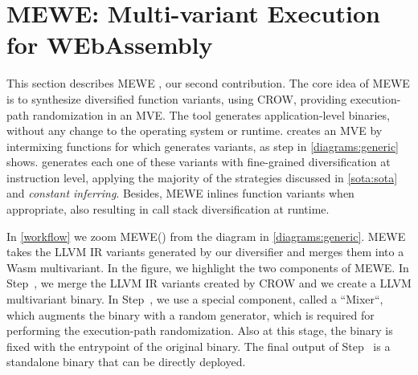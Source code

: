 \section{MEWE: Multi-variant Execution for WEbAssembly}
\label{section:mewe}

\newcommand{\tool}{MEWE\xspace}
\newcommand{\repourl}{TODO}
This section describes MEWE \cite{MEWE}, our second contribution. 
The core idea of \tool is to synthesize diversified function variants, using CROW, providing execution-path randomization in an MVE.
The tool generates application-level binaries, without any change to the operating system or \wasm runtime.
creates an MVE by intermixing functions for which generates variants, as step  in \autoref{diagrams:generic} shows.
generates each one of these variants with fine-grained diversification at instruction level, applying the majority of the strategies discussed in \autoref{sota:sota} and \emph{constant inferring}. Besides, \tool inlines function variants when appropriate, also resulting in call stack diversification at runtime.

In \autoref{workflow} we zoom MEWE() from the diagram in \autoref{diagrams:generic}. MEWE takes the LLVM IR variants generated by our diversifier and merges them into a Wasm multivariant.
In the figure, we highlight the two components of MEWE. 
In Step~, we merge the LLVM IR variants created by CROW and we create a LLVM multivariant binary.
In Step~, we use a special component, called a ``Mixer``,  which augments the binary with a random generator, which is required for performing the execution-path randomization. 
Also at this stage, the binary is fixed with the entrypoint of the original binary.
The final output of Step~ is a standalone \wasm binary that can be directly deployed. 

